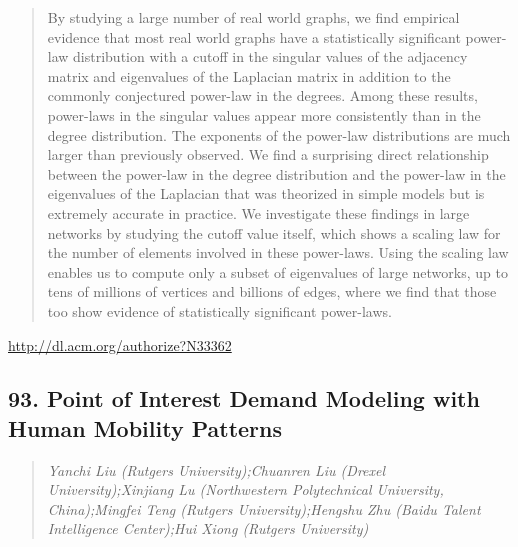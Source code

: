 \documentclass{article}
\begin{document}
\begin{quote}
By studying a large number of real world graphs, we find empirical evidence that most real world graphs have a statistically significant power-law distribution with a cutoff in the singular values of the adjacency matrix and eigenvalues of the Laplacian matrix in addition to the commonly conjectured power-law in the degrees. Among these results, power-laws in the singular values appear more consistently than in the degree distribution. The exponents of the power-law distributions are much larger than previously observed. We find a surprising direct relationship between the power-law in the degree distribution and the power-law in the eigenvalues of the Laplacian that was theorized in simple models but is extremely accurate in practice. We investigate these findings in large networks by studying the cutoff value itself, which shows a scaling law for the number of elements involved in these power-laws. Using the scaling law enables us to compute only a subset of eigenvalues of large networks, up to tens of millions of vertices and billions of edges, where we find that those too show evidence of statistically significant power-laws.
\end{quote}

\href{http://dl.acm.org/authorize?N33362}{http://dl.acm.org/authorize?N33362}

\subsection{93. Point of Interest Demand Modeling with Human Mobility Patterns}

\begin{quote}
\footnotesize{\textit{Yanchi Liu (Rutgers University);Chuanren Liu (Drexel University);Xinjiang Lu (Northwestern Polytechnical University, China);Mingfei Teng (Rutgers University);Hengshu Zhu (Baidu Talent Intelligence Center);Hui Xiong (Rutgers University)}}

\end{quote}
\end{document}
